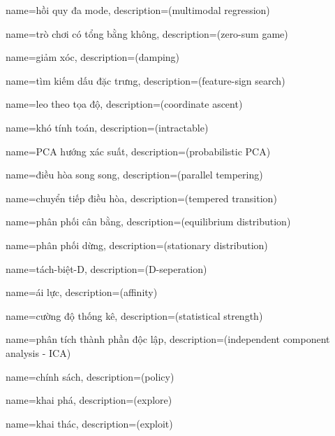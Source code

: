 {
    name={hồi quy đa mode},
    description={(multimodal regression)}
}

{
    name={trò chơi có tổng bằng không},
    description={(zero-sum game)}
}

{
    name={giảm xóc},
    description={(damping)}
}

{
    name={tìm kiếm dấu đặc trưng},
    description={(feature-sign search)}
}

{
    name={leo theo tọa độ},
    description={(coordinate ascent)}
}

{
    name={khó tính toán},
    description={(intractable)}
}

{
    name={PCA hướng xác suất},
    description={(probabilistic PCA)}
}

{
    name={điều hòa song song},
    description={(parallel tempering)}
}

{
    name={chuyển tiếp điều hòa},
    description={(tempered transition)}
}

{
    name={phân phối cân bằng},
    description={(equilibrium distribution)}
}

{
    name={phân phối dừng},
    description={(stationary distribution)}
}

{
    name={tách-biệt-D},
    description={(D-seperation)}
}

{
    name={ái lực},
    description={(affinity)}
}

{
    name={cường độ thống kê},
    description={(statistical strength)}
}

{
    name={phân tích thành phần độc lập},
    description={(independent component analysis - ICA)}
}

{
    name={chính sách},
    description={(policy)}
}

{
    name={khai phá},
    description={(explore)}
}

{
    name={khai thác},
    description={(exploit)}
}

